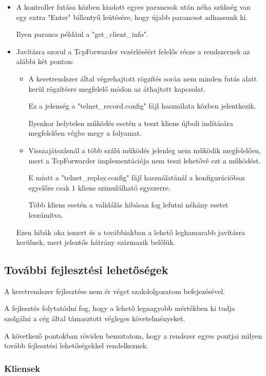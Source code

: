 \documentclass[a4paper,12pt,oneside]{report}
\begin{document}
\begin{itemize}
	\itemsep0em
		\item A kontroller futása közben kiadott egyes parancsok után néha szükség van egy extra "Enter" billentyű leütésére, hogy újabb parancsot adhassunk ki.

		Ilyen parancs például a "get\_client\_info".
		\item Javításra szorul a TcpForwarder vezérléséért felelős része a rendszernek az alábbi két ponton:
		\begin{itemize}
		\itemsep0em
		\item A keretrendszer által végrehajtott rögzítés során nem minden futás alatt kerül rögzítésre megfelelő módon az áthajtott kapcsolat. 
		
		Ez a jelenség a "telnet\_record.config" fájl használata közben jelentkezik.
		
		Ilyenkor helytelen működés esetén a teszt kliens újboli indítására megfelelően végbe megy a folyamat.
		\item Visszajátszásnál a több szálú működés jelenleg nem működik megfelelően, mert a TcpForwarder implementációja nem teszi lehetővé ezt a működést.

		E miatt a "telnet\_replay.config" fájl használatánál a konfigurációban egyelőre csak 1 kliens szimulálható egyszerre. 
		
		Több kliens esetén a validálás hibásan fog lefutni néhány esetet leszámítva.
		\end{itemize}
		
		Ezen hibák oka ismert és a továbbiakban a lehető leghamarabb javításra kerülnek, mert jelentős hátrány származik belőlük.
\end{itemize}

\subsection{További fejlesztési lehetőségek}

A keretrendszer fejlesztése nem ér véget szakdolgozatom befejezésével.

A fejlesztés folytatódni fog, hogy a lehető legnagyobb mértékben ki tudja szolgálni a cég által támasztott végleges követelményeket.

A következő pontokban röviden bemutatom, hogy a rendszer egyes pontjai milyen tovább fejlesztési lehetőségekkel rendelkeznek.

\subsubsection{Kliensek}
\end{document}
